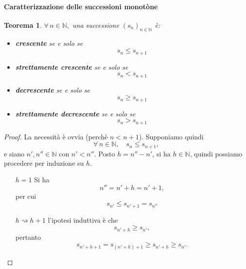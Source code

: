 \documentclass{article}
\theoremstyle{plain}
\newtheorem{thm}{Teorema}[section]
\theoremstyle{definition}
\theoremstyle{remark}
\begin{document}
\paragraph{Caratterizzazione delle successioni monotòne}
\begin{bxthm}
\begin{thm}
    $\forall\, n\in\mathbb{N},$ una successione $(s_n)_{n\in\mathbb{N}}$ è:
    \begin{itemize}
        \item \textbf{crescente} se e solo se 
        \[s_n\leq s_{n+1}\]
        \item \textbf{strettamente crescente} se e solo se 
        \[s_n<s_{n+1}\]
        \item \textbf{decrescente} se e solo se 
        \[s_n\geq s_{n+1}\]
        \item \textbf{strettamente decrescente} se e solo se 
        \[s_n>s_{n+1}\]
    \end{itemize}
\end{thm}
\end{bxthm}
\begin{proof}
    La necessità è ovvia (perchè $n<n+1$).
    Supponiamo quindi \[\forall\,n\in\mathbb{N},\quad s_n\leq s_{n+1},\]  e siano $n',n''\in\mathbb{N}$ con $n'<n''$.
    Posto $h=n''-n'$, si ha $h\in\mathbb{N}$, quindi possiamo procedere per induzione su $h$.
    \begin{itemize}
        \item[$h=1$] Si ha \[n''=n'+h=n'+1,\] per cui \[s_{n'}\leq s_{n'+1}=s_{n''}\]
        \item[$h\rightsquigarrow h+1$] l'ipotesi induttiva è che \[s_{n'+h}\geq s_{n'},\] pertanto \[s_{n'+h+1}=s_{(n'+h)+1}\geq s_{n'+h}\geq s_{n'}.\]
    \end{itemize}
\end{proof}

\vspace{10pt}
\end{document}
